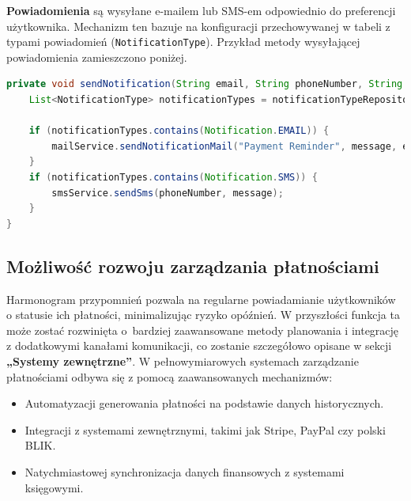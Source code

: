 \noindent \textbf{Powiadomienia} są wysyłane e-mailem lub SMS-em odpowiednio do preferencji użytkownika. Mechanizm ten bazuje na konfiguracji przechowywanej w tabeli z typami powiadomień (\texttt{NotificationType}).
Przykład metody wysyłającej powiadomienia zamieszczono poniżej.
\begin{lstlisting}[language=Java, style=JavaStyle, caption=Wysyłanie powiadomień]
private void sendNotification(String email, String phoneNumber, String message) {
    List<NotificationType> notificationTypes = notificationTypeRepository.findByUserEmail(email);

    if (notificationTypes.contains(Notification.EMAIL)) {
        mailService.sendNotificationMail("Payment Reminder", message, email);
    }
    if (notificationTypes.contains(Notification.SMS)) {
        smsService.sendSms(phoneNumber, message);
    }
}
\end{lstlisting}

\subsection{Możliwość rozwoju zarządzania płatnościami}
Harmonogram przypomnień pozwala na regularne powiadamianie użytkowników o statusie ich płatności, minimalizując ryzyko opóźnień. W przyszłości funkcja ta może zostać rozwinięta o~bardziej zaawansowane metody planowania i integrację z dodatkowymi kanałami komunikacji, co zostanie szczegółowo opisane w sekcji \textbf{„Systemy zewnętrzne”}. W pełnowymiarowych systemach zarządzanie płatnościami odbywa się z pomocą zaawansowanych mechanizmów:
\begin{itemize}
    \item Automatyzacji generowania płatności na podstawie danych historycznych.
    \item Integracji z systemami zewnętrznymi, takimi jak Stripe, PayPal czy polski BLIK.
    \item Natychmiastowej synchronizacja danych finansowych z systemami księgowymi.
\end{itemize}




